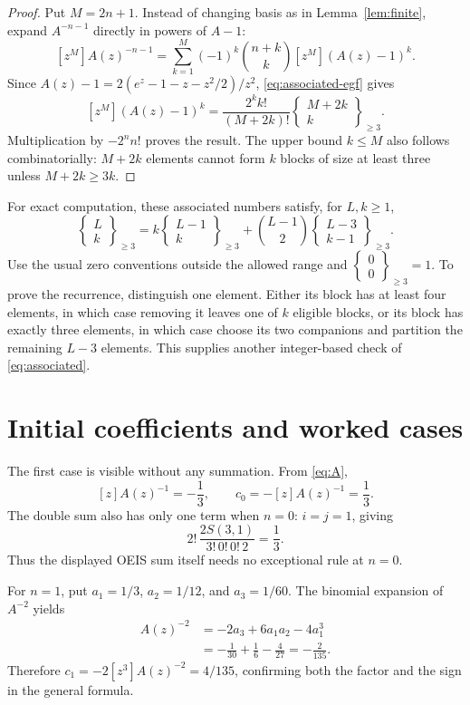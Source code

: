 \documentclass[11pt,letterpaper]{article}
\numberwithin{equation}{section}
\theoremstyle{remark}
\newcommand{\Sthree}[2]{\left\{\!\begin{matrix}#1\\#2\end{matrix}\!\right\}_{\geq 3}}
\begin{document}
\begin{proof}
Put $M=2n+1$. Instead of changing basis as in Lemma~\ref{lem:finite}, expand
$A^{-n-1}$ directly in powers of $A-1$:
\[
 [z^M]A(z)^{-n-1}
 =\sum_{k=1}^{M}(-1)^k\binom{n+k}{k}[z^M](A(z)-1)^k.
\]
Since $A(z)-1=2(e^z-1-z-z^2/2)/z^2$, \eqref{eq:associated-egf} gives
\[
 [z^M](A(z)-1)^k
 =\frac{2^k k!}{(M+2k)!}\Sthree{M+2k}{k}.
\]
Multiplication by $-2^nn!$ proves the result. The upper bound $k\leq M$
also follows combinatorially: $M+2k$ elements cannot form $k$ blocks of
size at least three unless $M+2k\geq3k$.
\end{proof}

For exact computation, these associated numbers satisfy, for $L,k\geq1$,
\begin{equation}
 \Sthree{L}{k}
 =k\Sthree{L-1}{k}
   +\binom{L-1}{2}\Sthree{L-3}{k-1}.
 \label{eq:associated-rec}
\end{equation}
Use the usual zero conventions outside the allowed range and
$\Sthree{0}{0}=1$. To prove the recurrence, distinguish one element. Either
its block has at least four elements, in which case removing it leaves
one of $k$ eligible blocks, or its block has exactly three elements, in
which case choose its two companions and partition the remaining $L-3$
elements. This supplies another integer-based check of \eqref{eq:associated}.

\section{Initial coefficients and worked cases}
\label{sec:examples}

The first case is visible without any summation. From \eqref{eq:A},
\[
 [z]A(z)^{-1}=-\frac13,
 \qquad
 c_0=-[z]A(z)^{-1}=\frac13.
\]
The double sum also has only one term when $n=0$: $i=j=1$, giving
\[
 2!\,\frac{2S(3,1)}{3!\,0!\,0!\,2}=\frac13.
\]
Thus the displayed OEIS sum itself needs no exceptional rule at $n=0$.

For $n=1$, put $a_1=1/3$, $a_2=1/12$, and $a_3=1/60$. The binomial
expansion of $A^{-2}$ yields
\begin{align*}
 [z^3]A(z)^{-2}
 &=-2a_3+6a_1a_2-4a_1^3\\
 &=-\frac1{30}+\frac16-\frac4{27}
 =-\frac2{135}.
\end{align*}
Therefore $c_1=-2[z^3]A(z)^{-2}=4/135$, confirming both the factor and the
sign in the general formula.
\end{document}
